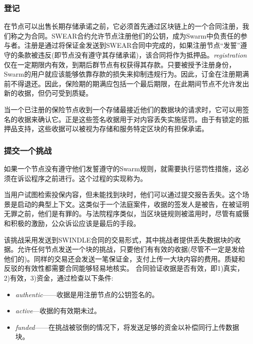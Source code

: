 \subsubsection{登记}

在节点可以出售长期存储承诺之前，它必须首先通过区块链上的一个合同注册，我们称之为合同。SWEAR合约允许节点注册他们的公钥，成为Swarm中负责任的参与者。注册是通过将保证金发送到SWEAR合同中完成的，如果注册节点“发誓”遵守的条款被违反(即节点没有遵守其存储承诺)，该合同将作为抵押品。\emph{registration}仅在一定期限内有效，到期后群节点有权获得其存款。只要被授予注册身份，Swarm的用户就应该能够依靠存款的损失来抑制违规行为。因此，订金在注册期满前不得退还。因此，保险期的期满应包括一个最后期限，在此期间节点不允许发出新的收据，但仍可受到质疑。

当一个已注册的保险节点收到一个存储最接近他们的数据块的请求时，它可以用签名的收据来确认它。正是这些签名收据用于对内容丢失实施惩罚。由于有锁定的抵押品支持，这些收据可以被视为存储和服务特定区块的有担保承诺。



\subsubsection{提交一个挑战}


如果一个节点没有遵守他们发誓遵守的Swarm规则，就需要执行惩罚性措施，这必须在诉讼程序之前进行。这个过程的实现称为。

当用户试图检索投保内容，但未能找到块时，他们可以通过提交报告丢失。这个场景是启动的典型上下文。这类似于一个法庭案件，收据的签发人是被告，在被证明无罪之前，他们是有罪的。与法院程序类似，当区块链规则被滥用时，尽管有威慑和积极的激励，公众诉讼应该是最后的手段。


该挑战采用发送到SWINDLE合同的交易形式，其中挑战者提供丢失数据块的收据。允许任何节点发送一个块的挑战，只要他们有有效的收据(尽管不一定是发给他们的)。同样的交易还会发送一笔保证金，支付上传一大块内容的费用。质疑和反驳的有效性都需要合同能够轻易地核实。
合同验证收据是否有效，即1)真实，2)有效，3)资金，通过检查以下条件:

\begin{itemize}
\item \emph{authentic}——收据是用注册节点的公钥签名的。
\item \emph{active}—收据的有效期未过。
\item \emph{funded}——在挑战被驳倒的情况下，将发送足够的资金以补偿同行上传数据块。
\end{itemize}

